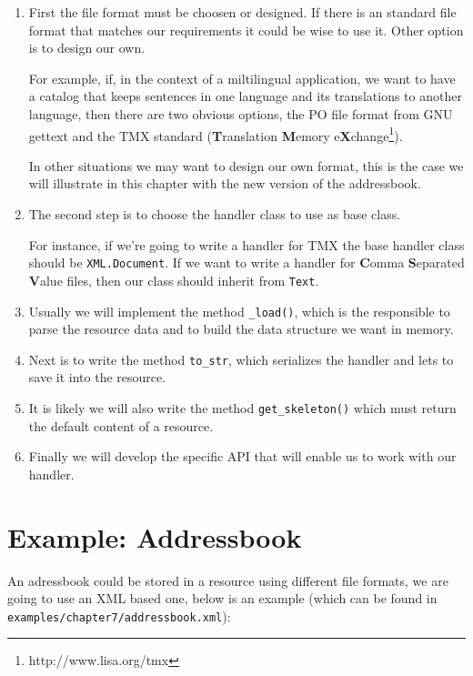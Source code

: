\begin{enumerate}
  \item First the file format must be choosen or designed. If there is an
    standard file format that matches our requirements it could be wise to
    use it. Other option is to design our own.

    For example, if, in the context of a miltilingual application, we want
    to have a catalog that keeps sentences in one language and its
    translations to another language, then there are two obvious options,
    the PO file format from GNU gettext and the TMX standard ({\bf T}ranslation
    {\bf M}emory e{\bf X}change\footnote{http://www.lisa.org/tmx}).

    In other situations we may want to design our own format, this is the
    case we will illustrate in this chapter with the new version of
    the addressbook.

  \item The second step is to choose the handler class to use as base class.

    For instance, if we're going to write a handler for TMX the base handler
    class should be {\tt XML.Document}. If we want to write a handler for
    {\bf C}omma {\bf S}eparated {\bf V}alue files, then our class should
    inherit from {\tt Text}.

  \item Usually we will implement the method {\tt \_load()}, which is the
    responsible to parse the resource data and to build the data structure
    we want in memory.

  \item Next is to write the method {\tt to\_str}, which serializes the
    handler and lets to save it into the resource.

  \item It is likely we will also write the method {\tt get\_skeleton()}
    which must return the default content of a resource.

  \item Finally we will develop the specific API that will enable us to
    work with our handler.
\end{enumerate}

\section{Example: Addressbook}

An adressbook could be stored in a resource using different file formats,
we are going to use an XML based one, below is an example (which can be
found in {\tt examples/chapter7/addressbook.xml}):

